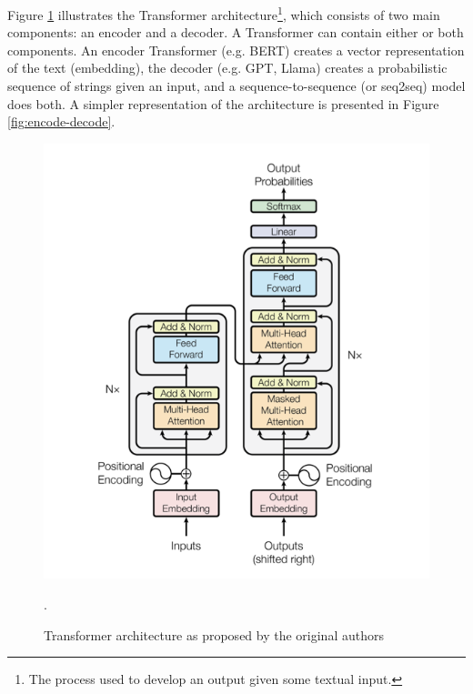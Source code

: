 \documentclass[12pt]{article}
\begin{document}
Figure \ref{fig:attention_arch} illustrates the Transformer architecture\footnote{The process used to develop an output given some textual input.}, which consists of two main components: an encoder and a decoder. A Transformer can contain either or both components. An encoder Transformer (e.g. BERT) creates a vector representation of the text (embedding),  the decoder (e.g. GPT, Llama) creates a probabilistic sequence of strings given an input, and a sequence-to-sequence (or seq2seq) model does both. A simpler representation of the architecture is presented in Figure \ref{fig:encode-decode}.
\begin{figure}
    \centering
    \includegraphics[width=0.5\linewidth]{images/architecture.png}
    \caption{Transformer architecture as proposed by the original authors \cite{DBLP:journals/corr/VaswaniSPUJGKP17}}.
    \label{fig:attention_arch}
\end{figure}
\end{document}
